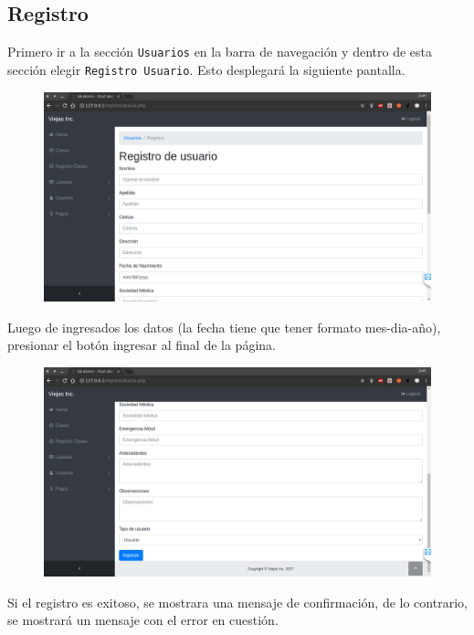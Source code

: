\documentclass[a4paper, 12pt, spanish]{report}
\begin{document}
\subsection{Registro}
\par Primero ir a la sección \verb|Usuarios| en la barra de navegación y dentro de esta sección elegir \verb|Registro Usuario|. Esto desplegará la siguiente pantalla.
\begin{figure}[H]
	\centering
	\includegraphics[width=\linewidth]{imagenes/registro}
	\label{fig:registro}
\end{figure}
\par Luego de ingresados los datos (la fecha tiene que tener formato mes-dia-año), presionar el botón ingresar al final de la página.
\begin{figure}[H]
	\centering
	\includegraphics[width=\linewidth]{imagenes/registro_ingresar}
	\label{fig:registro_ingresar}
\end{figure}
\par Si el registro es exitoso, se mostrara una mensaje de confirmación, de lo contrario, se mostrará un mensaje con el error en cuestión.
\end{document}
